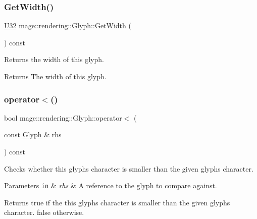 \subsubsection{\texorpdfstring{Get\+Width()}{GetWidth()}}
{\footnotesize\ttfamily \hyperlink{namespacemage_a41c104c036fba3756a74e19f793eeaa1}{U32} mage\+::rendering\+::\+Glyph\+::\+Get\+Width (\begin{DoxyParamCaption}{ }\end{DoxyParamCaption}) const\hspace{0.3cm}{\ttfamily [noexcept]}}

Returns the width of this glyph.

\begin{DoxyReturn}{Returns}
The width of this glyph. 
\end{DoxyReturn}
\hypertarget{structmage_1_1rendering_1_1_glyph_ae33b927cf35bde25b691310bbae6647a}{}\label{structmage_1_1rendering_1_1_glyph_ae33b927cf35bde25b691310bbae6647a} 
\subsubsection{\texorpdfstring{operator$<$()}{operator<()}\hspace{0.1cm}{\footnotesize\ttfamily [1/2]}}
{\footnotesize\ttfamily bool mage\+::rendering\+::\+Glyph\+::operator$<$ (\begin{DoxyParamCaption}\item[{const \hyperlink{structmage_1_1rendering_1_1_glyph}{Glyph} \&}]{rhs }\end{DoxyParamCaption}) const\hspace{0.3cm}{\ttfamily [noexcept]}}

Checks whether this glyph\textquotesingle{}s character is smaller than the given glyph\textquotesingle{}s character.


\begin{DoxyParams}[1]{Parameters}
\mbox{\tt in}  & {\em rhs} & A reference to the glyph to compare against. \\
\hline
\end{DoxyParams}
\begin{DoxyReturn}{Returns}
{\ttfamily true} if the this glyph\textquotesingle{}s character is smaller than the given glyph\textquotesingle{}s character. {\ttfamily false} otherwise. 
\end{DoxyReturn}
\hypertarget{structmage_1_1rendering_1_1_glyph_a9c796f1884ac97a80e4bbd7476c3dfb8}{}\label{structmage_1_1rendering_1_1_glyph_a9c796f1884ac97a80e4bbd7476c3dfb8} 
